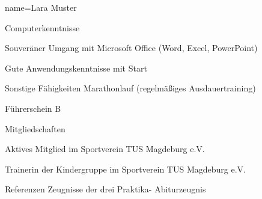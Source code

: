 \documentclass[a4paper, 12pt]{classycv}
\begin{document}
\begin{Resume}{%
	name=Lara Muster%
}
\begin{Entry}{Computerkenntnisse}{}
\begin{List}[skip above=0pt]
        \item Souveräner Umgang mit Microsoft Office (Word, Excel, PowerPoint)
        \item Gute Anwendungskenntnisse mit Start
    \end{List}
\end{Entry}
%
\begin{Entry}{Sonstige Fähigkeiten}{}%
    Marathonlauf (regelmäßiges Ausdauertraining)%
\end{Entry}
%
\begin{Entry}{Führerschein}{}%
    B%
\end{Entry}
%
\newpage%
%
%
\begin{Entry}{Mitgliedschaften}{}%
    \begin{List}[skip above=0pt]%
        \item Aktives Mitglied im Sportverein TUS Magdeburg e.V. 
        \item Trainerin der Kindergruppe im Sportverein TUS Magdeburg e.V.
    \end{List}
\end{Entry}
% 
\begin{Entry}{Referenzen}{}%
    Zeugnisse der drei Praktika- Abiturzeugnis
\end{Entry}
\end{Resume}
\end{document}
